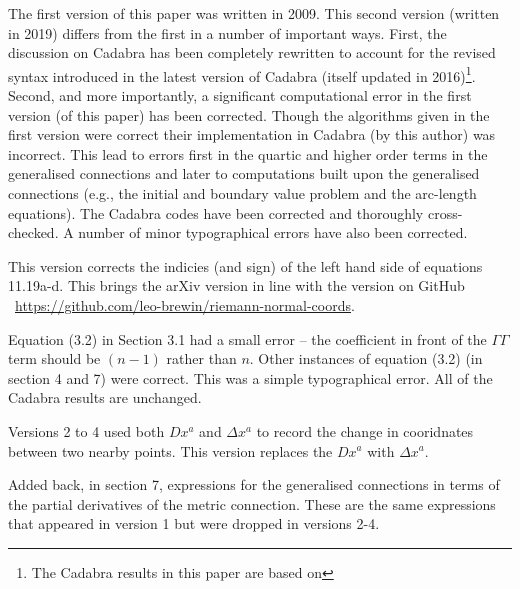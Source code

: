 \documentclass[a4paper,12pt]{article}
\numberwithin{equation}{section}
\begin{document}
\bgroup
{}
\small%
The first version of this paper was written in 2009. This second version (written in
2019) differs from the first in a number of important ways. First, the discussion on
Cadabra has been completely rewritten to account for the revised syntax introduced in the
latest version of Cadabra (itself updated in 2016)\footnote{The Cadabra results in this
paper are based on \CdbVersion}. Second, and more importantly, a significant
computational error in the first version (of this paper) has been corrected. Though the
algorithms given in the first version were correct their implementation in Cadabra (by
this author) was incorrect. This lead to errors first in the quartic and higher order
terms in the generalised connections and later to computations built upon the generalised
connections (e.g., the initial and boundary value problem and the arc-length equations).
The Cadabra codes have been corrected and thoroughly cross-checked. A number of minor
typographical errors have also been corrected.

\vskip 2pt

\small%
This version corrects the indicies (and sign) of the left hand side of equations 11.19a-d.
This brings the arXiv version in line with the version on GitHub
\ \url{https://github.com/leo-brewin/riemann-normal-coords}.

\vskip 2pt

\small%
Equation (3.2) in Section 3.1 had a small error -- the coefficient in front of the
$\Gamma \Gamma$ term should be $(n-1)$ rather than $n$. Other instances of equation (3.2)
(in section 4 and 7) were correct. This was a simple typographical error. All of the
Cadabra results are unchanged.

\vskip 2pt

\small%
Versions 2 to 4 used both $Dx^a$ and $\Delta x^a$ to record the change in cooridnates
between two nearby points. This version replaces the $Dx^a$ with $\Delta x^a$.

\vskip 2pt

\small%
Added back, in section 7, expressions for the generalised connections in terms of the
partial derivatives of the metric connection. These are the same expressions that
appeared in version 1 but were dropped in versions 2-4.
\egroup

\end{document}
